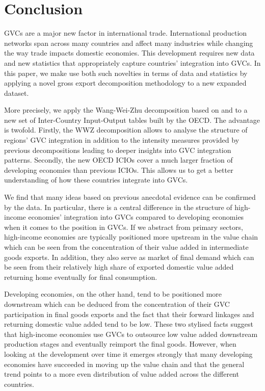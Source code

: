 \documentclass[11pt,a4paper]{article}
\begin{document}
\section{Conclusion}\label{sec:conclusion}
GVCs are a major new factor in international trade. International production networks span across many countries and affect many industries while changing the way trade impacts domestic economies. This development requires new data and new statistics that appropriately capture countries' integration into GVCs. In this paper, we make use both such novelties in terms of data and statistics by applying a novel gross export decomposition methodology to a new expanded dataset.

More precisely, we apply the Wang-Wei-Zhu decomposition based on \citet{zhwaetal13} and \citet{rokoetal14} to a new set of Inter-Country Input-Output tables built by the OECD. The advantage is twofold. Firstly, the WWZ decomposition allows to analyse the structure of regions' GVC integration in addition to the intensity measures provided by previous decompositions leading to deeper insights into GVC integration patterns. Secondly, the new OECD ICIOs cover a much larger fraction of developing economies than previous ICIOs. This allows us to get a better understanding of how these countries integrate into GVCs.

We find that many ideas based on previous anecdotal evidence can be confirmed by the data. In particular, there is a central difference in the structure of high-income economies' integration into GVCs compared to developing economies when it comes to the position in GVCs. If we abstract from primary sectors, high-income economies are typically positioned more upstream in the value chain which can be seen from the concentration of their value added in intermediate goods exports. In addition, they also serve as market of final demand which can be seen from their relatively high share of exported domestic value added returning home eventually for final consumption.

Developing economies, on the other hand, tend to be positioned more downstream which can be deduced from the concentration of their GVC participation in final goods exports and the fact that their forward linkages and returning domestic value added tend to be low. These two stylised facts suggest that high-income economies use GVCs to outsource low value added downstream production stages and eventually reimport the final goods. However, when looking at the development over time it emerges strongly that many developing economies have succeeded in moving up the value chain and that the general trend points to a more even distribution of value added across the different countries.
\end{document}
